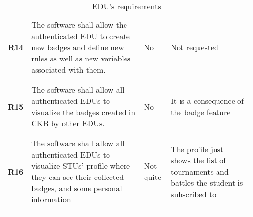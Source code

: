 \begin{longtable}[H]{l p{6.5cm} l p{3cm}}
    \textbf{R14} & The software shall allow the authenticated EDU to create new badges and define new rules as well as new variables associated with them.                                                                                                                                  & No                   & Not requested                                                                           \\
                 &                                                                                                                                                                                                                                                                          &                      &                                                                                         \\\hline & & & \\
    \textbf{R15} & The software shall allow all authenticated EDUs to visualize the badges created in CKB by other EDUs.                                                                                                                                                                    & No                   & It is a consequence of the badge feature                                                \\
                 &                                                                                                                                                                                                                                                                          &                      &                                                                                         \\\hline & & & \\
    \textbf{R16} & The software shall allow all authenticated EDUs to visualize STUs' profile where they can see their collected badges, and some personal information.                                                                                                                     & Not quite            & The profile just shows the list of tournaments and battles the student is subscribed to \\
                 &                                                                                                                                                                                                                                                                          &                      &                                                                                         \\
    \hline
    \caption{EDU's requirements}
\end{longtable}

